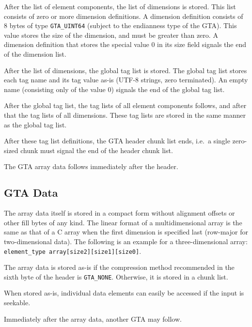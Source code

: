 \documentclass[a4paper,11pt]{article}
\newcommand{\code}[1]{\texttt{#1}}
\begin{document}
After the list of element components, the list of dimensions is stored.  This
list consists of zero or more dimension definitions. A dimension definition
consists of 8 bytes of type \code{GTA\_UINT64} (subject to the endianness type
of the GTA). This value stores the size of the dimension, and must be greater
than zero. A dimension definition that stores the special value 0 in its size
field signals the end of the dimension list.

After the list of dimensions, the global tag list is stored.  The global tag
list stores each tag name and its tag value as-is (\mbox{UTF-8} strings, zero
terminated). An empty name (consisting only of the value 0) signals
the end of the global tag list.

After the global tag list, the tag lists of all element components follows, and
after that the tag lists of all dimensions. These tag lists are stored in the
same manner as the global tag list.

After these tag list definitions, the GTA header chunk list ends, i.e.~a
single zero-sized chunk must signal the end of the header chunk list.

The GTA array data follows immediately after the header.


\subsection{GTA Data}
\label{sec:gta-data}

The array data itself is stored in a compact form without alignment offsets or
other fill bytes of any kind. The linear format of a multidimensional array is
the same as that of a C array when the first dimension is specified last
(row-major for two-dimensional data). The following is an example for a
three-dimensional array: \code{element\_type array[size2][size1][size0]}.

The array data is stored as-is if the compression method recommended in the
sixth byte of the header is \code{GTA\_NONE}. Otherwise, it is stored in a chunk
list.

When stored as-is, individual data elements can easily be accessed if the input
is seekable.

Immediately after the array data, another GTA may follow.



%
\end{document}
